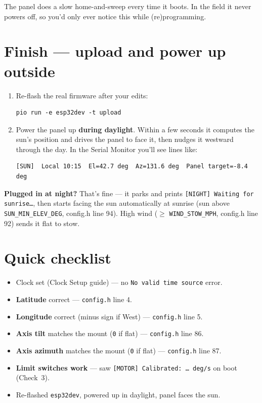 \documentclass[11pt]{article}
\begin{document}
\begin{note}
The panel does a slow home-and-sweep every time it boots. In the field it never
powers off, so you'd only ever notice this while (re)programming.
\end{note}

\section{Finish --- upload and power up outside}
\begin{enumerate}
  \item Re-flash the real firmware after your edits:
\begin{lstlisting}
pio run -e esp32dev -t upload
\end{lstlisting}
  \item Power the panel up \textbf{during daylight}. Within a few seconds it computes
        the sun's position and drives the panel to face it, then nudges it westward
        through the day. In the Serial Monitor you'll see lines like:
\begin{lstlisting}
[SUN]  Local 10:15  El=42.7 deg  Az=131.6 deg  Panel target=-8.4 deg
\end{lstlisting}
\end{enumerate}

\begin{tip}
\textbf{Plugged in at night?} That's fine --- it parks and prints
\texttt{[NIGHT] Waiting for sunrise\ldots}, then starts facing the sun automatically
at sunrise (sun above \texttt{SUN\_MIN\_ELEV\_DEG}, config.h line 94). High wind
(\(\geq\) \texttt{WIND\_STOW\_MPH}, config.h line 92) sends it flat to stow.
\end{tip}

\section{Quick checklist}
\begin{itemize}[leftmargin=2.2em,itemsep=5pt]
  \item[$\square$] Clock set (Clock Setup guide) --- no \texttt{No valid time source} error.
  \item[$\square$] \textbf{Latitude} correct --- \texttt{config.h} line 4.
  \item[$\square$] \textbf{Longitude} correct (minus sign if West) --- \texttt{config.h} line 5.
  \item[$\square$] \textbf{Axis tilt} matches the mount (\texttt{0} if flat) --- \texttt{config.h} line 86.
  \item[$\square$] \textbf{Axis azimuth} matches the mount (\texttt{0} if flat) --- \texttt{config.h} line 87.
  \item[$\square$] \textbf{Limit switches work} --- saw \texttt{[MOTOR] Calibrated:\ \ldots\ deg/s} on boot (Check~3).
  \item[$\square$] Re-flashed \texttt{esp32dev}, powered up in daylight, panel faces the sun.
\end{itemize}
\end{document}
